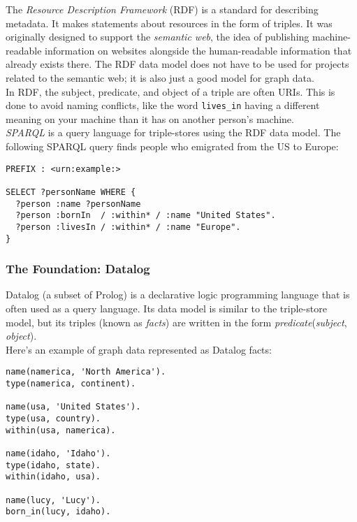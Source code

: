 \documentclass[12pt, titlepage]{article}
\begin{document}
The \textit{Resource Description Framework} (RDF) is a standard for describing metadata. It makes statements about resources in the form of triples. It was originally designed to support the \textit{semantic web}, the idea of publishing machine-readable information on websites alongside the human-readable information that already exists there. The RDF data model does not have to be used for projects related to the semantic web; it is also just a good model for graph data. \\

In RDF, the subject, predicate, and object of a triple are often URIs. This is done to avoid naming conflicts, like the word \texttt{lives\_in} having a different meaning on your machine than it has on another person's machine. \\

\textit{SPARQL} is a query language for triple-stores using the RDF data model. The following SPARQL query finds people who emigrated from the US to Europe:

\begin{verbatim}
PREFIX : <urn:example:>

SELECT ?personName WHERE {
  ?person :name ?personName
  ?person :bornIn  / :within* / :name "United States".
  ?person :livesIn / :within* / :name "Europe".
}
\end{verbatim}

\subsubsection{The Foundation: Datalog}

Datalog (a subset of Prolog) is a declarative logic programming language that is often used as a query language. Its data model is similar to the triple-store model, but its triples (known as \textit{facts}) are written in the form \textit{predicate}(\textit{subject}, \textit{object}). \\

Here's an example of graph data represented as Datalog facts:

\begin{verbatim}
name(namerica, 'North America').
type(namerica, continent).

name(usa, 'United States').
type(usa, country).
within(usa, namerica).

name(idaho, 'Idaho').
type(idaho, state).
within(idaho, usa).

name(lucy, 'Lucy').
born_in(lucy, idaho).
\end{verbatim}
\end{document}
